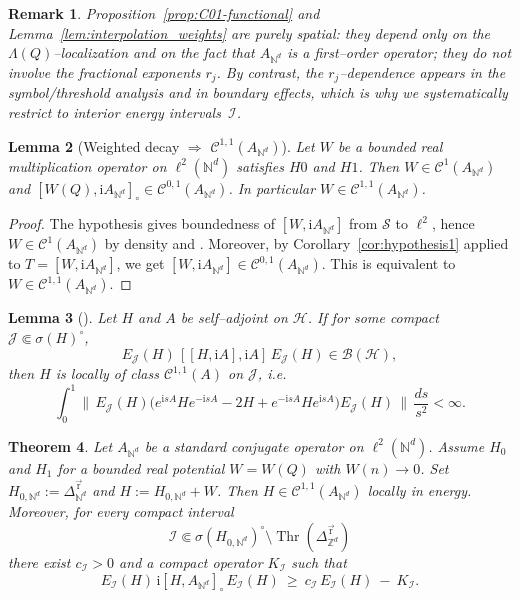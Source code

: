 \documentclass[10pt]{amsart}
\newcommand{\Z}{{\mathbb{Z}}}
\newcommand{\N}{{\mathbb{N}}}
\newcommand{\1}{{\mathbb{I}}}
\newcommand{\Cc}{\mathcal{C}}
\newcommand{\Ic}{\mathcal{I}}
\newcommand{\Jc}{\mathcal{J}}
\newcommand{\Sc}{\mathcal{S}}
\newcommand{\Thr}{\operatorname{Thr}}
\numberwithin{equation}{section}
\newtheorem{theorem}{Theorem}[section]%
\newtheorem{lemma}[theorem]{Lemma}%
\newtheorem{remark}[theorem]{Remark}%
\begin{document}
\begin{remark}\label{rem:negative-rj}
Proposition~\ref{prop:C01-functional} and Lemma~\ref{lem:interpolation_weights} are purely spatial:
they depend only on the $\Lambda(Q)$--localization and on the fact that $A_{\N^d}$ is a first--order
operator; they do not involve the fractional exponents $r_j$.
By contrast, the $r_j$--dependence appears in the symbol/threshold analysis and in boundary effects,
which is why we systematically restrict to interior energy intervals~$\Ic$.
\end{remark}

\begin{lemma}[Weighted decay $\Rightarrow$ $\mathcal{C}^{1,1}(A_{\N^d})$]\label{lem:W-C11-weighted}
Let $W$ be a bounded real multiplication operator on $\ell^2(\N^d)$ satisfies \textbf{$H0$}
and \textbf{$H1$}.
Then \( W \in \mathcal{C}^{1}(A_{\N^d}) \) and \( [W(Q),\mathrm i A_{\N^d}]_\circ\in \mathcal{C}^{0,1}(A_{\N^d}) \).
In particular \( W \in \mathcal{C}^{1,1}(A_{\N^d}) \).
\end{lemma}

\begin{proof}
The hypothesis gives boundedness of $[W,\mathrm i A_{\N^d}]$ from $\Sc$ to $\ell^2$, hence $W\in\Cc^1(A_{\N^d})$ by density and \cite[Lemma~6.2.9]{ABG}.
Moreover, by Corollary~\ref{cor:hypothesis1} applied to $T=[W,\mathrm i A_{\N^d}]$, we get $[W,\mathrm i A_{\N^d}]\in\Cc^{0,1}(A_{\N^d})$.
This is equivalent to $W\in\Cc^{1,1}(A_{\N^d})$.
\end{proof}

\begin{lemma}[\cite{ABG,GJ1}]\label{lem:C2loc_implies_C11loc}
Let $H$ and $A$ be self--adjoint on $\mathcal H$. If for some compact $\Jc\Subset\sigma(H)^\circ$,
\[
E_\Jc(H)\,[[H,\mathrm{i}A],\mathrm{i}A]\,E_\Jc(H)\in\mathcal{B}(\mathcal{H}),
\]
then $H$ is locally of class $\mathcal{C}^{1,1}(A)$ on $\Jc$, i.e.
\[
\int_0^1 \Big\|\, E_\Jc(H)\Big(e^{\mathrm{i}sA}He^{-\mathrm{i}sA}-2H+e^{-\mathrm{i}sA}He^{\mathrm{i}sA}\Big)E_\Jc(H)\,\Big\|\,
\frac{ds}{s^2}<\infty.
\]
\end{lemma}

\begin{theorem}\label{thm:mou}
Let $A_{\N^d}$ be a standard conjugate operator on $\ell^2(\N^d)$. Assume \textbf{$H_0$} and \textbf{$H_1$} for a bounded real potential $W=W(Q)$ with $W(n)\to0$.
Set $H_{0,\N^d}:=\Delta^{\vec{\mathrm{r}}}_{\N^d}$ and $H:=H_{0,\N^d}+W$.
Then $H\in \mathcal{C}^{1,1}(A_{\N^d})$ locally in energy.
Moreover, for every compact interval
\[
\Ic\Subset\sigma(H_{0,\N^d})^\circ\setminus\Thr(\Delta_{\Z^d}^{\vec{\mathrm{r}}})
\]
there exist $c_{\Ic}>0$ and a compact operator $K_\Ic$ such that
\begin{equation}\label{eq:pert-mourre}
E_{\Ic}(H)\,\mathrm{i}[H,A_{\N^d}]_\circ\,E_{\Ic}(H)\ \ge\ c_{\Ic}\,E_{\Ic}(H)\ -\ K_\Ic.
\end{equation}
\end{theorem}
\end{document}
